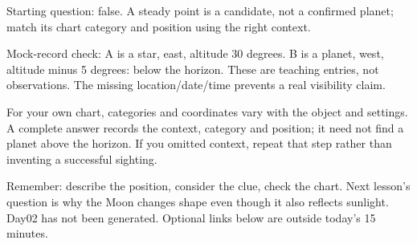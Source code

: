 \documentclass[11pt]{article}
\begin{document}
Starting question: false. A steady point is a candidate, not a confirmed planet; match its chart category and position using the right context.

Mock-record check: A is a star, east, altitude 30 degrees. B is a planet, west, altitude minus 5 degrees: below the horizon. These are teaching entries, not observations. The missing location/date/time prevents a real visibility claim.

For your own chart, categories and coordinates vary with the object and settings. A complete answer records the context, category and position; it need not find a planet above the horizon. If you omitted context, repeat that step rather than inventing a successful sighting.

Remember: describe the position, consider the clue, check the chart. Next lesson's question is why the Moon changes shape even though it also reflects sunlight. Day02 has not been generated. Optional links below are outside today's 15 minutes.
\end{document}
